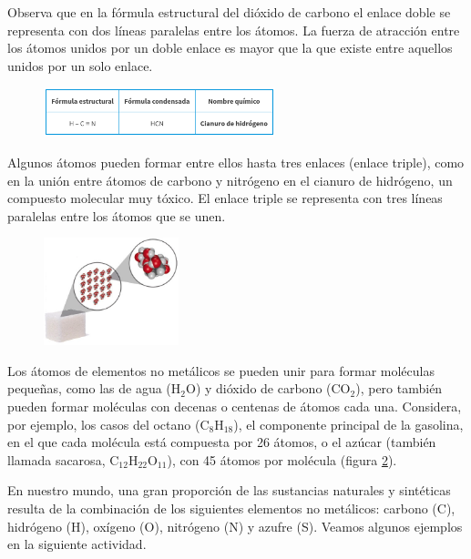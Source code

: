 \documentclass[11pt]{book}
\begin{document}
Observa que en la fórmula estructural del dióxido de carbono el enlace doble se representa con dos líneas
paralelas entre los átomos. La fuerza de atracción entre los átomos unidos por un doble enlace es mayor
que la que existe entre aquellos unidos por un solo enlace.

\begin{figure}[H]
  \centering
  \includegraphics[width=0.6\textwidth]{formulas_hcn.png}
  \label{fig:formulas_hcn}
\end{figure}

Algunos átomos pueden formar entre ellos hasta tres enlaces (enlace triple),
como en la unión entre átomos de carbono y nitrógeno en el cianuro de hidrógeno,
un compuesto molecular muy tóxico. El enlace triple se representa con tres líneas
paralelas entre los átomos que se unen.

\begin{figure}
  \centering
  \includegraphics[width=0.35\textwidth]{azucar.jpg}
  \label{fig:azucar}
\end{figure}

Los átomos de elementos no metálicos se pueden unir para formar moléculas pequeñas,
como las de agua (H$_2$O) y dióxido de carbono (CO$_2$), pero también pueden formar moléculas con
decenas o centenas de átomos cada una. Considera, por ejemplo, los casos del octano (C$_8$H$_{18}$),
el componente principal de la gasolina, en el que cada molécula está compuesta por 26 átomos,
o el azúcar (también llamada sacarosa, C$_{12}$H$_{22}$O$_{11}$), con 45 átomos por molécula (figura \ref{fig:azucar}).

En nuestro mundo, una gran proporción de las sustancias naturales y sintéticas resulta de la
combinación de los siguientes elementos no metálicos: carbono (C), hidrógeno (H), oxígeno (O), nitrógeno
(N) y azufre (S). Veamos algunos ejemplos en la siguiente actividad.
\end{document}
